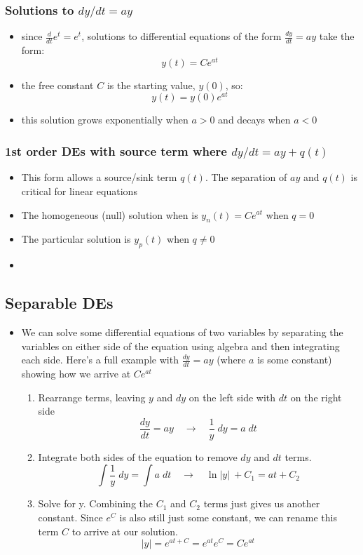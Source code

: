 \documentclass{article}
\begin{document}
\begin{multicols*}{2}
\boldmath{}
\subsubsection[1st order DEs without source]{Solutions to $dy/dt = ay$}
\unboldmath{}

\begin{itemize}
    \item since $\frac{d}{dt} e^t = e^t$, solutions to differential equations of the form $\frac{dy}{dt} = ay$ take the form:
        \[ y(t) = Ce^{at}\]
    \item the free constant $C$ is the starting value, $y(0)$, so:
        \[ y(t) = y(0)e^{at}\]
    \item this solution grows exponentially when $a>0$ and decays when $a<0$
\end{itemize}


\boldmath{}
\subsubsection[1st order DEs with source term]{1st order DEs with source term where $dy/dt = ay +q(t)$}
\unboldmath{}

\begin{itemize}
    \item This form allows a source/sink term $q(t)$. The separation of $ay$ and $q(t)$ is critical for linear equations
    \item The homogeneous (null) solution when is $y_n(t)=Ce^{at}$ when $q=0$
    \item The particular solution is $y_p(t)$ when $q \neq 0$
    \item  
\end{itemize}

\subsection{Separable DEs}
\begin{itemize}
    \item We can solve some differential equations of two variables by separating the variables on either side of the equation using algebra and then integrating each side. Here's a full example with $\frac{dy}{dt}=ay$ (where $a$ is some constant) showing how we arrive at $Ce^{at}$
    \begin{enumerate}
        \item Rearrange terms, leaving $y$ and $dy$ on the left side with $dt$ on the right side
            \[ \frac{dy}{dt}=ay \quad \rightarrow \quad \frac{1}{y}\;dy = a \; dt\]
        \item Integrate both sides of the equation to remove $dy$ and $dt$ terms.
            \[\int \frac{1}{y}\;dy = \int a \; dt \quad \rightarrow \quad \ln{\lvert y \rvert}\ + C_1= at + C_2 \]
        \item Solve for y. Combining the $C_1$ and $C_2$ terms just gives us another constant. Since $e^C$ is also still just some constant, we can rename this term $C$ to arrive at our solution.
            \[ \lvert y \rvert = e^{at+C} = e^{at}e^C = Ce^{at}\]


\end{enumerate}
\end{itemize}
\end{multicols*}
\end{document}
